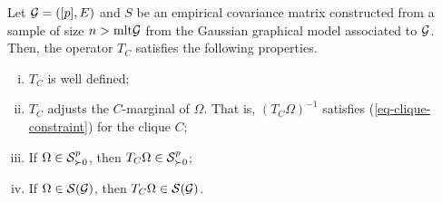\begin{proposition}
    Let $\G = ([p], E)$ and $S$ be an empirical covariance matrix constructed from a sample of size $n > \t{mlt}{\G}$ from the Gaussian graphical model associated to $\G$. Then, the operator $T_C$ satisfies the following properties.
    \begin{enumerate}[i.]
        \item $T_C$ is well defined;
        \item $T_C$ adjusts the $C$-marginal of $\Omega$. That is, $(T_C \Omega)^{-1}$ satisfies (\ref{eq-clique-constraint}) for the clique $C$;
        \item If $\Omega \in \S^p_{\succ 0}$, then $T_C \Omega \in \S^p_{\succ 0}$;
        \item If $\Omega \in \S(\G)$, then $T_C \Omega \in \S(\G)$.
    \end{enumerate}    
\end{proposition}
